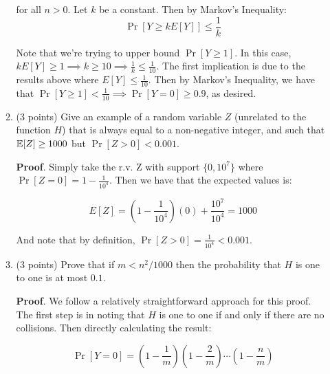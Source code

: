 \documentclass{article}
\begin{document}
\begin{enumerate}
\begin{enumerate}[,label=\alph*.]
for all $n > 0$. Let $k$ be a constant. Then by Markov's Inequality:%
\noindent\noindent\[%
\Pr[Y \geq kE[Y]] \leq \frac{1}{k}
\]%

Note that we're trying to upper bound $\Pr[Y \geq 1]$. In this case, 
$kE[Y] \geq 1 \implies k \geq 10 \implies \frac{1}{k} \leq \frac{1}{10}$.
The first implication is due to the results above where $E[Y] \leq \frac{1}{10}$. 
Then by Markov's Inequality, we have that 
$\Pr[Y \geq 1] < \frac{1}{10} \implies \Pr[Y = 0] \geq 0.9$, as desired.
\mdfloatright{\ensuremath{\Box}}%

\item{}
(3 points) Give an example of a random variable $Z$ (unrelated to the function $H$) that is always equal to a non-negative integer, and such that
$\mathbb{E}[Z] \geq 1000$ but $\Pr[ Z > 0] < 0.001$.%

\begin{mdbmarginx}{1ex}{0pt}{1ex}{0pt}%
\noindent{}\textbf{Proof}.  Simply take the r.v. Z with support $\{0, 10^7\}$ where $\Pr[Z = 0] = 1 - \frac{1}{10^4}$. Then we have that the expected values is:%
\end{mdbmarginx}%
\noindent\noindent\[%
E[Z] = (1 - \frac{1}{10^4})(0) + \frac{10^7}{10^4} = 1000
\]%

And note that by definition, $\Pr[Z > 0] = \frac{1}{10^4} < 0.001$.
\mdfloatright{\ensuremath{\Box}}%

\item{}
(3 points) Prove that if $m  < n^2/1000$ then the probability that $H$ is one to one is at most $0.1$.%

\begin{mdbmarginx}{1ex}{0pt}{1ex}{0pt}%
\noindent{}\textbf{Proof}.  We follow a relatively straightforward approach for this proof. The first step is in noting that $H$ is one to one if and only if
there are no collisions. Then directly calculating the result:%
\end{mdbmarginx}%
\noindent\noindent\[%
\Pr[Y = 0] = (1-\frac{1}{m})(1 - \frac{2}{m})\cdots(1 - \frac{n}{m}) 
\]%


\end{enumerate}
\end{enumerate}
\end{document}
